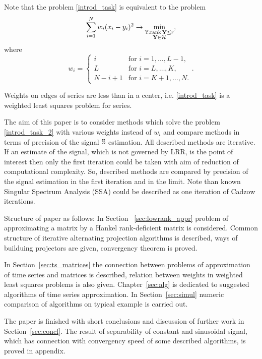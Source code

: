 \documentclass[12pt,a4paper,fleqn,leqno]{article}
\def\rank{\mathop{\mathrm{rank}}}
\begin{document}
Note that the problem \eqref{introd_task} is equivalent to the problem
\begin{equation}\label{introd_task_2}
\sum_{i = 1}^N w_i(x_i - y_i)^2 \to \min_{\substack{\tsY: \rank \bfY \le r \\ \bfY \in \calH}},
\end{equation}
where
\begin{equation}
\label{eq:w}
w_i = \begin{cases}
i & \text{for $i = 1, \ldots, L-1,$}\\
L & \text{for $i = L, \ldots, K,$}\\
N - i + 1 & \text{for $i = K + 1, \ldots, N.$}
\end{cases}.
\end{equation}

Weights on edges of series are less than in a center, i.e. \eqref{introd_task} is a weighted least squares problem for series.

The aim of this paper is to consider methods which solve the problem \eqref{introd_task_2} with various weights instead of $w_i$ and compare methods in terms of precision of the signal $\mathbb{S}$ estimation. All described methods are iterative. If an estimate of the signal, which is not governed by LRR, is the point of interest then only the first iteration could be taken with aim of reduction of computational complexity. So, described methods are compared by precision of the signal estimation in the first iteration and in the limit. Note than known Singular Spectrum Analysis (SSA) \cite{Broomhead.King1986, Vautard.etal1992, Elsner.Tsonis1996, Golyandina.etal2001, Ghil.etal2002, Golyandina.Zhigljavsky2012} could be
described as one iteration of Cadzow iterations.

Structure of paper as follows:  In Section ~\ref{sec:lowrank_appr} problem of approximating a matrix by a Hankel rank-deficient matrix is considered. Common structure of iterative alternating projection algorithms is described, ways of builduing projectors are given, convergency theorem is proved.

In Section~\ref{sec:ts_matrices} the connection between problems of approximation of time series and matrices is described, relation between weights in weighted least squares problems is also given. Chapter~\ref{sec:alg} is dedicated to suggested algorithms of time series approximation. In Section~\ref{sec:simul} numeric comparison of algorithms on typical example is carried out.

The paper is finished with short conclusions and discussion of further work in Section~\ref{sec:concl}. The result of separability of constant and sinusoidal signal, which has connection with convergency speed of some described algorithms, is proved in appendix.
\end{document}
